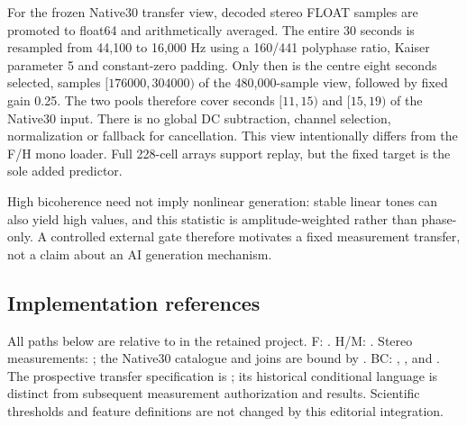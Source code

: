 For the frozen Native30 transfer view, decoded stereo FLOAT samples are
promoted to float64 and arithmetically averaged. The entire 30 seconds is
resampled from 44,100 to 16,000 Hz using a 160/441 polyphase ratio,
Kaiser parameter 5 and constant-zero padding. Only then is the centre
eight seconds selected, samples $[176000,304000)$ of the 480,000-sample
view, followed by fixed gain 0.25. The two pools therefore cover seconds
$[11,15)$ and $[15,19)$ of the Native30 input. There is no global DC
subtraction, channel selection, normalization or fallback for cancellation.
This view intentionally differs from the F/H mono loader. Full 228-cell
arrays support replay, but the fixed target is the sole added predictor.

High bicoherence need not imply nonlinear generation: stable linear tones
can also yield high values, and this statistic is amplitude-weighted rather
than phase-only. A controlled external gate therefore motivates a fixed
measurement transfer, not a claim about an AI generation mechanism.

\subsection{Implementation references}
\begingroup\raggedright
All paths below are relative to
 in the retained project.
F: .
H/M: .
Stereo measurements: ; the Native30
catalogue and joins are bound by
.
BC: ,
,
 and
.
The prospective transfer specification is
; its historical conditional
language is distinct from subsequent measurement authorization and results.
Scientific thresholds and feature definitions are not changed by this
editorial integration.\par
\endgroup
